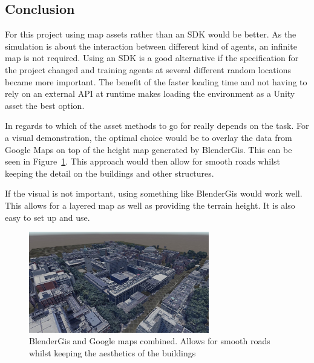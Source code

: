 \subsection{Conclusion}
For this project using map assets rather than an SDK would be better. As the simulation is about the interaction between different kind of agents, an infinite map is not required. Using an SDK is a good alternative if the specification for the project changed and training agents at several different random locations became more important. The benefit of the faster loading time and not having to rely on an external API at runtime makes loading the environment as a Unity asset the best option. 

In regards to which of the asset methods to go for really depends on the task. For a visual demonstration, the optimal choice would be to overlay the data from Google Maps on top of the height map generated by BlenderGis. This can be seen in Figure~\ref{maps:figure:combined}. This approach would then allow for smooth roads whilst keeping the detail on the buildings and other structures. 

If the visual is not important, using something like BlenderGis would work well. This allows for a layered map as well as providing the terrain height. It is also easy to set up and use. 

\begin{figure}[H]
    \centering
    \includegraphics[width=0.7\textwidth]{06_Implementation/00_Maps/Images/CombinedCropped.JPG}
    \caption{BlenderGis and Google maps combined. Allows for smooth roads whilst keeping the aesthetics of the buildings}
    \label{maps:figure:combined}
\end{figure}
